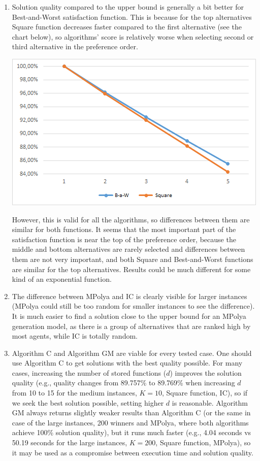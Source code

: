 \begin{enumerate}
	\item Solution quality compared to the upper bound is generally a bit better for Best-and-Worst satisfaction function. This is because for the top alternatives Square function decreases faster compared to the first alternative (see the chart below), so algorithms' score is relatively worse when selecting second or third alternative in the preference order.
	\begin{center}
		\includegraphics[scale=0.75]{satfuncomp1}
	\end{center}
	However, this is valid for all the algorithms, so differences between them are similar for both functions. It seems that the most important part of the satisfaction function is near the top of the preference order, because the middle and bottom alternatives are rarely selected and differences between them are not very important, and both Square and Best-and-Worst functions are similar for the top alternatives. Results could be much different for some kind of an exponential function.
	\item The difference between MPolya and IC is clearly visible for larger instances (MPolya could still be too random for smaller instances to see the difference). It is much easier to find a solution close to the upper bound for an MPolya generation model, as there is a group of alternatives that are ranked high by most agents, while IC is totally random.
	\item Algorithm C and Algorithm GM are viable for every tested case. One should use Algorithm C to get solutions with the best quality possible. For many cases, increasing the number of stored functions ($d$) improves the solution quality (e.g., quality changes from 89.757\% to 89.769\% when increasing $d$ from 10 to 15 for the medium instances, $K = 10$, Square function, IC), so if we seek the best solution possible, setting higher $d$ is reasonable. Algorithm GM always returns slightly weaker results than Algorithm C (or the same in case of the large instances, 200 winners and MPolya, where both algorithms achieve 100\% solution quality), but it runs much faster (e.g., 4.04 seconds vs 50.19 seconds for the large instances, $K = 200$, Square function, MPolya), so it may be used as a compromise between execution time and solution quality.

\end{enumerate}
